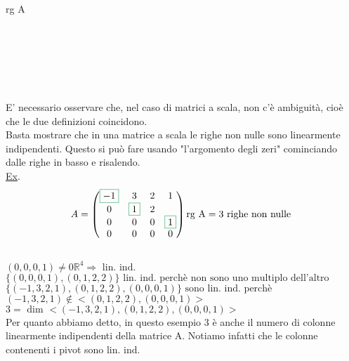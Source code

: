 \newpage
\centering\textsf{rg A}\\
\noindent\begin{minipage}{.35\linewidth}
\color{ForestGreen} \\ \color{ForestGreen}\\
\end{minipage}
\begin{minipage}{.25\linewidth}
\color{ForestGreen}\\
\color{ForestGreen}\boxed{\textsf{\small \normalcolor = }}\\
\color{ForestGreen}
\end{minipage}
\flushleft
\textsf{\small E' necessario osservare che, nel caso di matrici a scala, non c'è ambiguità, cioè che le due definizioni coincidono.}\\
\textsf{\small Basta mostrare che in una matrice a scala le righe non nulle sono linearmente indipendenti. Questo si può fare usando "l'argomento degli zeri" cominciando dalle righe in basso e risalendo.}\\
\textsf{\small \underline{Ex}.}\\
\[
A =
\begin{pmatrix}
	\color{ForestGreen}\boxed{\normalcolor -1} & 3 &  2 & 1\\
	0 & \color{ForestGreen}\boxed{\normalcolor 1}  &  2\\
	0 & 0  &  0 & \color{ForestGreen}\boxed{\normalcolor 1}\\
	0 & 0  &  0 & 0\\
\end{pmatrix}
\text{rg A} = 3 \text{ righe non nulle }
\]\\
\(
(0,0,0,1) \neq 0\mathbb{R}^4 \Rightarrow \text{ lin. ind.}
\)\\
\(
\{ (0,0,0,1),(0,1,2,2)\} \text{ lin. ind. perchè non sono uno multiplo dell'altro}
\)\\
\(
\{ (-1,3,2,1),(0,1,2,2),(0,0,0,1)\} \text{ sono lin. ind. perchè }
\)\\
\(
(-1,3,2,1) \notin <(0,1,2,2),(0,0,0,1)>
\)\\
\(
3 = \text{ dim } <(-1,3,2,1),(0,1,2,2),(0,0,0,1)>
\)\\
\textsf{\small Per quanto abbiamo detto, in questo esempio 3 è anche il numero di colonne linearmente indipendenti della matrice A. Notiamo infatti che le colonne contenenti i pivot sono lin. ind.}\\
